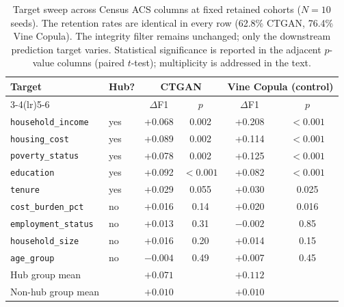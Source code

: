 \documentclass[pdflatex,sn-mathphys-num]{sn-jnl}
\theoremstyle{thmstyleone}%
\theoremstyle{thmstyletwo}%
\theoremstyle{thmstylethree}%
\begin{document}
\begin{table}[htbp]
\centering
\caption{Target sweep across Census ACS columns at fixed retained cohorts ($N=10$ seeds). The retention rates are identical in every row (62.8\% CTGAN, 76.4\% Vine Copula). The integrity filter remains unchanged; only the downstream prediction target varies. Statistical significance is reported in the adjacent $p$-value columns (paired $t$-test); multiplicity is addressed in the text.}
\label{tab:label_conditional_sweep}
\footnotesize
\setlength{\tabcolsep}{6pt}
\begin{tabular}{@{}llcccc@{}}
\toprule
Target & Hub? & \multicolumn{2}{c}{CTGAN} & \multicolumn{2}{c}{Vine Copula (control)} \\
\cmidrule(lr){3-4}\cmidrule(lr){5-6}
 &  & $\Delta$F1 & $p$ & $\Delta$F1 & $p$ \\
\midrule
\texttt{household\_income} & yes & +0.068 & 0.002 & +0.208 & $<0.001$ \\
\texttt{housing\_cost} & yes & +0.089 & 0.002 & +0.114 & $<0.001$ \\
\texttt{poverty\_status} & yes & +0.078 & 0.002 & +0.125 & $<0.001$ \\
\texttt{education} & yes & +0.092 & $<0.001$ & +0.082 & $<0.001$ \\
\texttt{tenure} & yes & +0.029 & 0.055 & +0.030 & 0.025 \\
\addlinespace
\texttt{cost\_burden\_pct} & no & +0.016 & 0.14 & +0.020 & 0.016 \\
\texttt{employment\_status} & no & +0.013 & 0.31 & $-0.002$ & 0.85 \\
\texttt{household\_size} & no & +0.016 & 0.20 & +0.014 & 0.15 \\
\texttt{age\_group} & no & $-0.004$ & 0.49 & +0.007 & 0.45 \\
\midrule
Hub group mean & & $+0.071$ & & $+0.112$ & \\
Non-hub group mean & & $+0.010$ & & $+0.010$ & \\
\bottomrule
\end{tabular}
\end{table}
\end{document}
